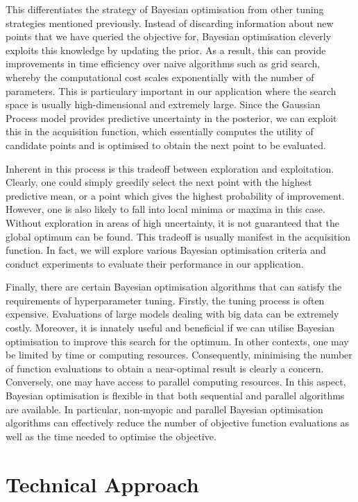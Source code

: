 \documentclass[letterpaper]{article}
\begin{document}
This differentiates the strategy of Bayesian optimisation from other tuning
strategies mentioned previously. Instead of discarding information about new points
that we have queried the objective for, Bayesian optimisation cleverly exploits this
knowledge by updating the prior. As a result, this can provide improvements in time
efficiency over naive algorithms such as grid search, whereby the computational
cost scales exponentially with the number of parameters.  This is particulary
important in our application where the search space is usually high-dimensional
and extremely large. Since the Gaussian Process model provides predictive uncertainty
in the posterior, we can exploit this in the acquisition function, which essentially
computes the utility of candidate points and is optimised to obtain the next point
to be evaluated.

Inherent in this process is this tradeoff between exploration and exploitation.
Clearly, one could simply greedily select the next point with the highest predictive
mean, or a point which gives the highest probability of improvement. However, one
is also likely to fall into local minima or maxima in this case. Without exploration
in areas of high uncertainty, it is not guaranteed that the global optimum can be
found. This tradeoff is usually manifest in the acquisition function. In fact,
we will explore various Bayesian optimisation criteria and conduct experiments to
evaluate their performance in our application.

Finally, there are certain Bayesian optimisation algorithms that can satisfy the
requirements of hyperparameter tuning. Firstly, the tuning process is often
expensive. Evaluations of large models dealing with big data can be extremely
costly. Moreover, it is innately useful and beneficial if we can utilise
Bayesian optimisation to improve this search for the optimum. In other contexts,
one may be limited by time or computing resources. Consequently, minimising the
number of function evaluations to obtain a near-optimal result is clearly a concern.
Conversely, one may have access to parallel computing resources. In this aspect,
Bayesian optimisation is flexible in that both sequential and parallel algorithms
are available. In particular, non-myopic and parallel Bayesian optimisation
algorithms can effectively reduce the number of objective function evaluations
as well as the time needed to optimise the objective.

\section{Technical Approach}
\end{document}

